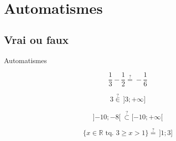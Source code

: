 \documentclass[14pt]{beamer}
\newcommand{\R}{\mathbb{R}}
\begin{document}
\section{Automatismes}

\subsection{Vrai ou faux}

\begin{frame}

\centering \huge
Automatismes

\end{frame}

\begin{frame}{1}

	\[  \dfrac13 - \dfrac12 \stackrel{?}{=} -\dfrac16 \]

\end{frame}

\begin{frame}{2}

	\[  3 \stackrel{?}{\in} \, ]3 ; {+}\infty] \]

\end{frame}

\begin{frame}{3}

	\[  ]{-10} ; -8[ \ \stackrel{?}{\subset} [-10 ; {+}\infty [ \]

\end{frame}

\begin{frame}{4}

	\[ \{ x \in \R \text{ tq. } 3 \geq x > 1 \} \stackrel{?}{=} \, ]1 ; 3] \]

\end{frame}
\end{document}
